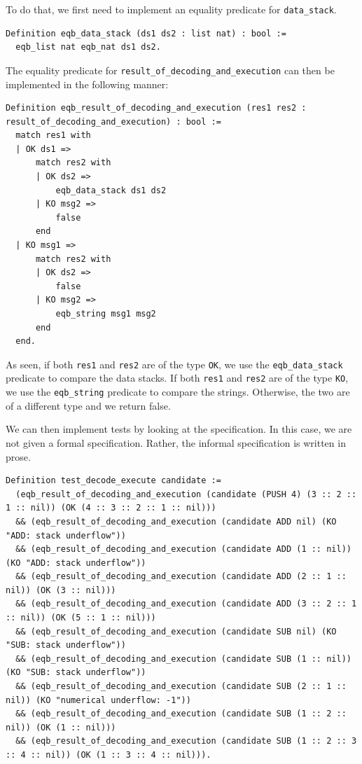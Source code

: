 \documentclass{article}
\begin{document}
To do that, we first need to implement an equality predicate for \texttt{data\_stack}.

\begin{lstlisting}
Definition eqb_data_stack (ds1 ds2 : list nat) : bool :=
  eqb_list nat eqb_nat ds1 ds2.
\end{lstlisting}

The equality predicate for \texttt{result\_of\_decoding\_and\_execution} can then be implemented in the following manner:

\begin{lstlisting}
Definition eqb_result_of_decoding_and_execution (res1 res2 : result_of_decoding_and_execution) : bool :=
  match res1 with
  | OK ds1 =>
      match res2 with
      | OK ds2 =>
          eqb_data_stack ds1 ds2
      | KO msg2 =>
          false
      end
  | KO msg1 =>
      match res2 with
      | OK ds2 =>
          false
      | KO msg2 =>
          eqb_string msg1 msg2
      end
  end.
\end{lstlisting}

As seen, if both \texttt{res1} and \texttt{res2} are of the type \texttt{OK}, we use the \texttt{eqb\_data\_stack} predicate to compare the data stacks. If both \texttt{res1} and \texttt{res2} are of the type \texttt{KO}, we use the \texttt{eqb\_string} predicate to compare the strings. Otherwise, the two are of a different type and we return false.

We can then implement tests by looking at the specification. In this case, we are not given a formal specification. Rather, the informal specification is written in prose. 

\begin{lstlisting}
Definition test_decode_execute candidate :=
  (eqb_result_of_decoding_and_execution (candidate (PUSH 4) (3 :: 2 :: 1 :: nil)) (OK (4 :: 3 :: 2 :: 1 :: nil)))
  && (eqb_result_of_decoding_and_execution (candidate ADD nil) (KO "ADD: stack underflow"))
  && (eqb_result_of_decoding_and_execution (candidate ADD (1 :: nil)) (KO "ADD: stack underflow"))
  && (eqb_result_of_decoding_and_execution (candidate ADD (2 :: 1 :: nil)) (OK (3 :: nil)))
  && (eqb_result_of_decoding_and_execution (candidate ADD (3 :: 2 :: 1 :: nil)) (OK (5 :: 1 :: nil)))
  && (eqb_result_of_decoding_and_execution (candidate SUB nil) (KO "SUB: stack underflow"))
  && (eqb_result_of_decoding_and_execution (candidate SUB (1 :: nil)) (KO "SUB: stack underflow"))
  && (eqb_result_of_decoding_and_execution (candidate SUB (2 :: 1 :: nil)) (KO "numerical underflow: -1"))
  && (eqb_result_of_decoding_and_execution (candidate SUB (1 :: 2 :: nil)) (OK (1 :: nil)))
  && (eqb_result_of_decoding_and_execution (candidate SUB (1 :: 2 :: 3 :: 4 :: nil)) (OK (1 :: 3 :: 4 :: nil))).
\end{lstlisting}
\end{document}
